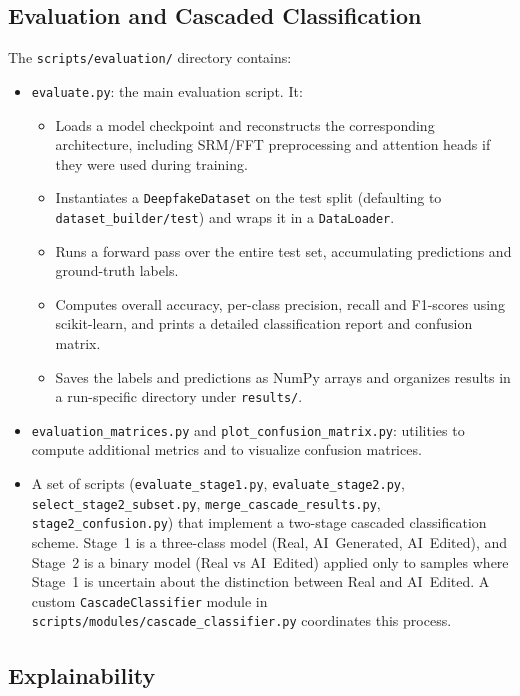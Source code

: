 \subsection{Evaluation and Cascaded Classification}

The \texttt{scripts/evaluation/} directory contains:
\begin{itemize}
  \item \texttt{evaluate.py}: the main evaluation script. It:
  \begin{itemize}
    \item Loads a model checkpoint and reconstructs the corresponding architecture, including SRM/FFT preprocessing and attention heads if they were used during training.
    \item Instantiates a \texttt{DeepfakeDataset} on the test split (defaulting to \texttt{dataset\_builder/test}) and wraps it in a \texttt{DataLoader}.
    \item Runs a forward pass over the entire test set, accumulating predictions and ground-truth labels.
    \item Computes overall accuracy, per-class precision, recall and F1-scores using scikit-learn, and prints a detailed classification report and confusion matrix.
    \item Saves the labels and predictions as NumPy arrays and organizes results in a run-specific directory under \texttt{results/}.
  \end{itemize}
  \item \texttt{evaluation\_matrices.py} and \texttt{plot\_confusion\_matrix.py}: utilities to compute additional metrics and to visualize confusion matrices.
  \item A set of scripts (\texttt{evaluate\_stage1.py}, \texttt{evaluate\_stage2.py}, \texttt{select\_stage2\_subset.py}, \texttt{merge\_cascade\_results.py}, \texttt{stage2\_confusion.py}) that implement a two-stage cascaded classification scheme. Stage~1 is a three-class model (Real, AI~Generated, AI~Edited), and Stage~2 is a binary model (Real vs AI~Edited) applied only to samples where Stage~1 is uncertain about the distinction between Real and AI~Edited. A custom \texttt{CascadeClassifier} module in \texttt{scripts/modules/cascade\_classifier.py} coordinates this process.
\end{itemize}

\subsection{Explainability}

